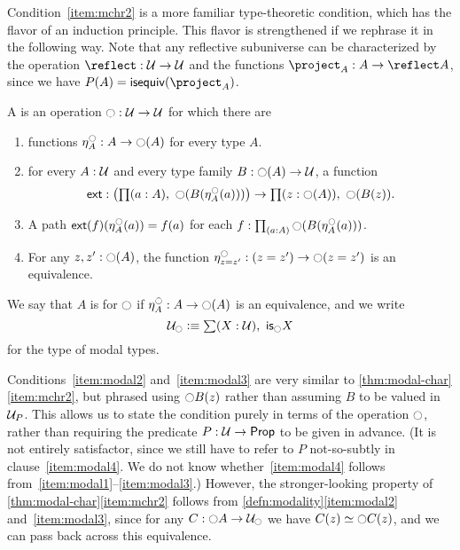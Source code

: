 Condition~\ref{item:mchr2} is a more familiar type-theoretic condition, which has the flavor of an induction principle.
This flavor is strengthened if we rephrase it in the following way.
Note that any reflective subuniverse can be characterized by the operation $\reflect:\type\to\type$ and the functions $\project_A:A\to \reflect A$, since we have $P(A) = \isequiv(\project_A)$.

\begin{defn}\label{defn:modality}
A  is an operation $\modal:\type\to\type$ for which there are
\begin{enumerate}
\item functions $\mreturn^\modal_A:A\to\modal(A)$ for every type $A$.\label{item:modal1}
\item for every $A:\type$ and every type family $B:\modal(A)\to\type$, a function\label{item:modal2}
\begin{equation*}
\ext:\big(\prd{a:A}\modal(B(\mreturn^\modal_A(a)))\big)\to\prd{z:\modal(A)}\modal(B(z)).
\end{equation*}
\item A path $\ext(f)(\mreturn^\modal_A(a)) = f(a)$ for each $f:\prd{a:A}\modal(B(\mreturn^\modal_A(a)))$.\label{item:modal3}
\item For any $z,z':\modal(A)$, the function $\mreturn^\modal_{z=z'} : (z=z') \to \modal(z=z')$ is an equivalence.\label{item:modal4}
\end{enumerate}
We say that $A$ is  for $\modal$ if $\mreturn^\modal_A:A\to\modal(A)$ is an equivalence, and we write
\[\modaltype\defeq\sm{X:\type}\ismodal X\]
for the type of modal types.
\end{defn}

Conditions~\ref{item:modal2} and~\ref{item:modal3} are very similar to \autoref{thm:modal-char}\ref{item:mchr2}, but phrased using $\modal B(z)$ rather than assuming $B$ to be valued in $\P$.
This allows us to state the condition purely in terms of the operation $\modal$, rather than requiring the predicate $P:\type\to\prop$ to be given in advance.
(It is not entirely satisfactor, since we still have to refer to $P$ not-so-subtly in clause~\ref{item:modal4}.
We do not know whether~\ref{item:modal4} follows from~\ref{item:modal1}--\ref{item:modal3}.)
However, the stronger-looking property of \autoref{thm:modal-char}\ref{item:mchr2} follows from \autoref{defn:modality}\ref{item:modal2} and~\ref{item:modal3}, since for any $C:\modal A \to \modaltype$ we have $C(z) \simeq \modal C(z)$, and we can pass back across this equivalence.

